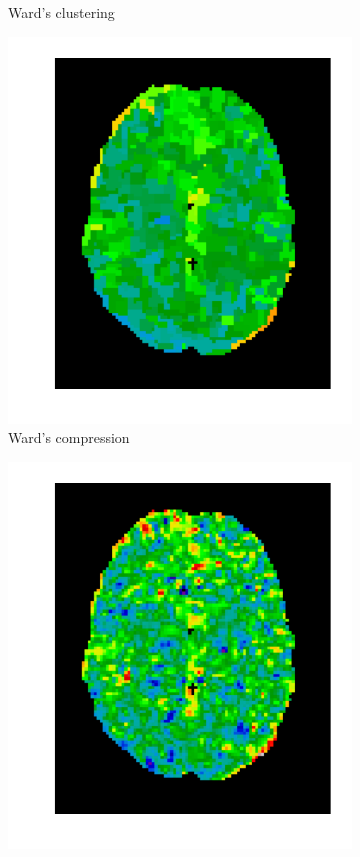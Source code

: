 \documentclass{frontiersSCNS} %
\begin{document}
\begin{figure}[hbtp]
\begin{center}
\begin{subfigure}[b]{.23\linewidth}
        \caption{Ward's clustering}
      \end{subfigure}
      \begin{subfigure}[b]{.23\linewidth}
        \includegraphics[width=\linewidth]{img/clustering/ward_compressed}
        \caption{Ward's compression}
      \end{subfigure}
      \begin{subfigure}[b]{.23\linewidth}
        \includegraphics[width=\linewidth]{img/clustering/original}

\end{subfigure}
\end{center}
\end{figure}
\end{document}
